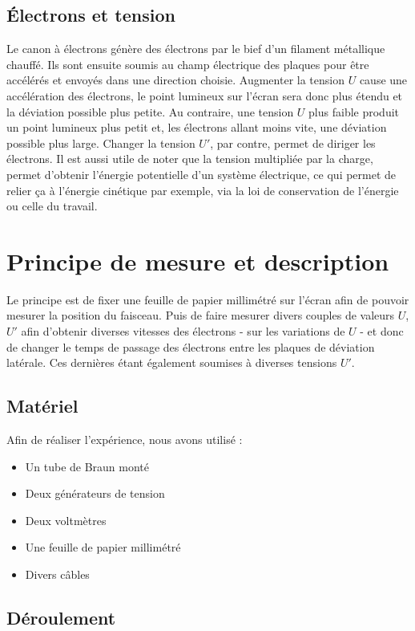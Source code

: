 \documentclass[11pt]{article}
\begin{document}
\subsection{Électrons et tension}
Le canon à électrons génère des électrons par le bief d'un filament métallique chauffé. Ils sont ensuite soumis au champ électrique des plaques pour être accélérés et envoyés dans une direction choisie. Augmenter la tension $U$ cause une accélération des électrons, le point lumineux sur l'écran sera donc plus étendu et la déviation possible plus petite. Au contraire, une tension $U$ plus faible produit un point lumineux plus petit et, les électrons allant moins vite, une déviation possible plus large. Changer la tension $U'$, par contre, permet de diriger les électrons. Il est aussi utile de noter que la tension multipliée par la charge, permet d'obtenir l'énergie potentielle d'un système électrique, ce qui permet de relier ça à l'énergie cinétique par exemple, via la loi de conservation de l'énergie ou celle du travail.

\section{Principe de mesure et description}

Le principe est de fixer une feuille de papier millimétré sur l'écran afin de pouvoir mesurer la position du faisceau. Puis de faire mesurer divers couples de valeurs $U$, $U'$ afin d'obtenir diverses vitesses des électrons - sur les variations de $U$ - et donc de changer le temps de passage des électrons entre les plaques de déviation latérale. Ces dernières étant également soumises à diverses tensions $U'$.

\subsection{Matériel}

Afin de réaliser l'expérience, nous avons utilisé :
\begin{itemize}
\item Un tube de Braun monté
\item Deux générateurs de tension
\item Deux voltmètres
\item Une feuille de papier millimétré
\item Divers câbles
\end{itemize}

\subsection{Déroulement}
\end{document}
